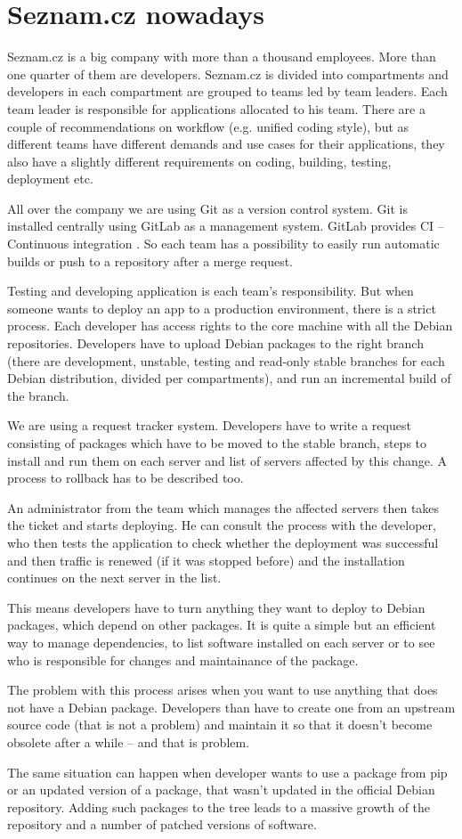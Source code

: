 \chapter{Seznam.cz nowadays}

Seznam.cz is a big company with more than a thousand employees. More than one quarter of them are developers. Seznam.cz is divided into compartments and developers in each compartment are grouped to teams led by team leaders. Each team leader is responsible for applications allocated to his team. There are a couple of recommendations on workflow (e.g. unified coding style),  but as different teams have different demands and use cases for their applications, they also have a slightly different requirements on coding, building, testing, deployment etc.

All over the company we are using Git as a version control system. Git is installed centrally using GitLab as a management system. GitLab provides CI – Continuous integration \cite{gitlabci}.
So each team has a possibility to easily run automatic builds or push to a repository after a merge request.

Testing and developing application is each team’s responsibility. But when someone wants to deploy an app to a production environment, there is a strict process. Each developer has access rights to the core machine with all the Debian \cite{debian} repositories. Developers have to upload Debian packages to the right branch (there are development, unstable, testing and read-only stable branches for each Debian distribution, divided per compartments), and run an incremental build of the branch.

We are using a request tracker system. Developers have to write a request consisting of packages which have to be moved to the stable branch, steps to install and run them on each server and list of servers affected by this change. A process to rollback has to be described too.

An administrator from the team which manages the affected servers then takes the ticket and starts deploying. He can consult the process with the developer, who then tests the application to check whether the deployment was successful and then traffic is renewed (if it was stopped before) and the installation continues on the next server in the list.

This means developers have to turn anything they want to deploy to Debian packages, which depend on other packages. It is quite a simple but an efficient way to manage dependencies, to list software installed on each server or to see who is responsible for changes and maintainance of the package.

The problem with this process arises when you want to use anything that does not have a Debian package. Developers than have to create one from an upstream source code (that is not a problem) and maintain it so that it doesn’t become obsolete after a while – and that is problem.

The same situation can happen when developer wants to use a package from pip or an updated version of a package, that wasn’t updated in the official Debian repository. Adding such packages to the tree leads to a massive growth of the repository and a number of patched versions of software.
